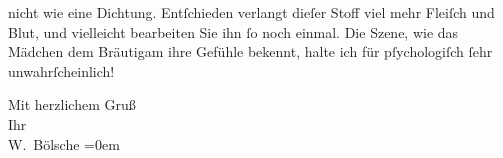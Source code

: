                nicht wie eine Dichtung. Entſchieden verlangt dieſer Stoff viel mehr Fleiſch und
               Blut, und vielleicht bearbeiten Sie ihn{ }ſo noch einmal. Die Szene, {\pb}wie
               das Mädchen dem Bräutigam ihre Gefühle bekennt, halte ich für pſychologiſch{ }ſehr
               unwahrſcheinlich!\pend
           
\pstart
           Mit herzlichem Gruß{\\[\baselineskip]} Ihr{\\[\baselineskip]}\spacefill\mbox{W. Bölsche}\pend
           \leftskip=0em{}\endnumbering{}  \newcommand{\dateiname}{L00221}\newcommand{\titel}{Wilhelm Bölsche an Arthur Schnitzler, 12. 6. 1893}\newcommand{\editorInnen}{Martin Anton Müller und Gerd-Hermann Susen}
